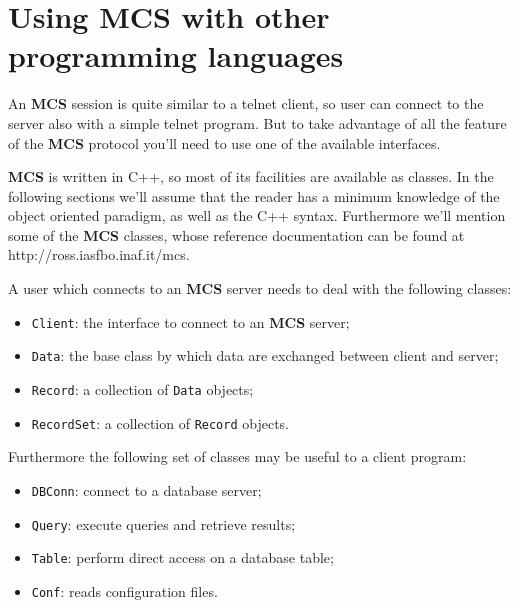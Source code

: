 \documentclass[12pt,titlepage]{article}
\newcommand{\mcs}{\textbf{MCS} }
\def\url{http://ross.iasfbo.inaf.it/mcs}
\begin{document}
\section{Using \mcs with other programming languages}
\label{Using mcs with other programming languages}
An \mcs session is quite similar to a telnet client, so user can
connect to the server also with a simple telnet program. But to take
advantage of all the feature of the \mcs protocol you'll need to use
one of the available interfaces.

\noindent \mcs is written in C++, so most of its facilities are
available as classes. In the following sections we'll assume that the
reader has a minimum knowledge of the object oriented paradigm, as
well as the C++ syntax. Furthermore we'll mention some of the \mcs
classes, whose reference documentation can be found at
\textsf{\url}.

\noindent A user which connects to an \mcs server needs to deal with the
following classes:
\begin{itemize}
\item \verb|Client|: the interface to connect to an \mcs server;
\item \verb|Data|: the base class by which data are exchanged between
  client and server;
\item \verb|Record|: a collection of \verb|Data| objects;
\item \verb|RecordSet|: a collection of \verb|Record| objects.
\end{itemize}
%
Furthermore the following set of classes may be useful to a client
program:
\begin{itemize}
\item \verb|DBConn|: connect to a database server;
\item \verb|Query|: execute queries and retrieve results;
\item \verb|Table|: perform direct access on a database table;
\item \verb|Conf|: reads configuration files.
\end{itemize}
\end{document}
